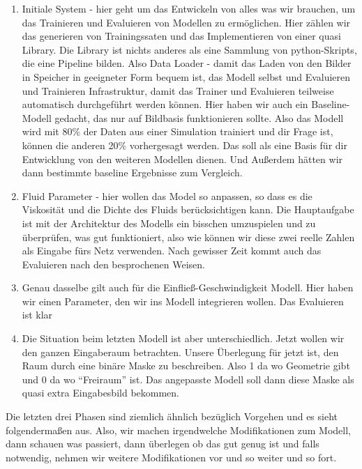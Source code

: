 \documentclass[margin=0.05in, tmargin=0.01in]{article}
\begin{document}
\begin{enumerate}
\item Initiale System - hier geht um das Entwickeln von alles was wir brauchen, um das Trainieren und Evaluieren von Modellen zu ermöglichen. Hier zählen wir das generieren von Trainingssaten und das Implementieren von einer quasi Library. Die Library ist nichts anderes als eine Sammlung von python-Skripts, die eine Pipeline bilden. Also Data Loader - damit das Laden von den Bilder in Speicher in geeigneter Form bequem ist, das Modell selbst und Evaluieren und Trainieren Infrastruktur, damit das Trainer und Evaluieren teilweise automatisch durchgeführt werden können.
Hier haben wir auch ein Baseline-Modell gedacht, das nur auf Bildbasis funktionieren sollte. Also das Modell wird mit 80\% der Daten aus einer Simulation trainiert und dir Frage ist, können die anderen 20\% vorhergesagt werden. Das soll als eine Basis für dir Entwicklung von den weiteren Modellen dienen. Und  Außerdem hätten wir dann bestimmte baseline Ergebnisse zum Vergleich.

\item Fluid Parameter - hier wollen das Model so anpassen, so dass es die Viskosität und die Dichte des Fluids berücksichtigen kann. Die Hauptaufgabe ist mit der Architektur des Modells ein bisschen umzuspielen und zu überprüfen, was gut funktioniert, also wie können wir diese zwei reelle Zahlen als Eingabe fürs Netz verwenden. Nach gewisser Zeit kommt auch das Evaluieren nach den besprochenen Weisen.

\item Genau dasselbe gilt auch für die Einfließ-Geschwindigkeit Modell. Hier haben wir einen Parameter, den wir ins Modell integrieren wollen. Das Evaluieren ist klar

\item Die Situation beim letzten Modell ist aber unterschiedlich. Jetzt wollen wir den ganzen Eingaberaum betrachten. Unsere Überlegung für jetzt ist, den Raum durch eine binäre Maske zu beschreiben. Also 1 da wo Geometrie gibt und 0 da wo ``Freiraum'' ist. Das angepasste Modell soll dann diese Maske als quasi extra Eingabesbild bekommen.
\end{enumerate}

Die letzten drei Phasen sind ziemlich ähnlich bezüglich Vorgehen und es sieht folgendermaßen aus. Also, wir machen irgendwelche Modifikationen zum Modell, dann schauen was passiert, dann überlegen ob das gut genug ist und falls notwendig, nehmen wir weitere Modifikationen vor und so weiter und so fort.
\end{document}
